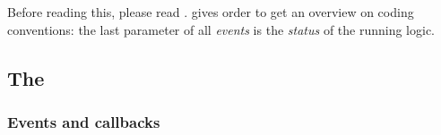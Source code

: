 Before reading this, please read .
 gives order to get an overview on
coding conventions: the last parameter of all \emph{events} is the
\emph{status} of the running logic.

\subsection{The  }

    \subsubsection{Events and callbacks}

